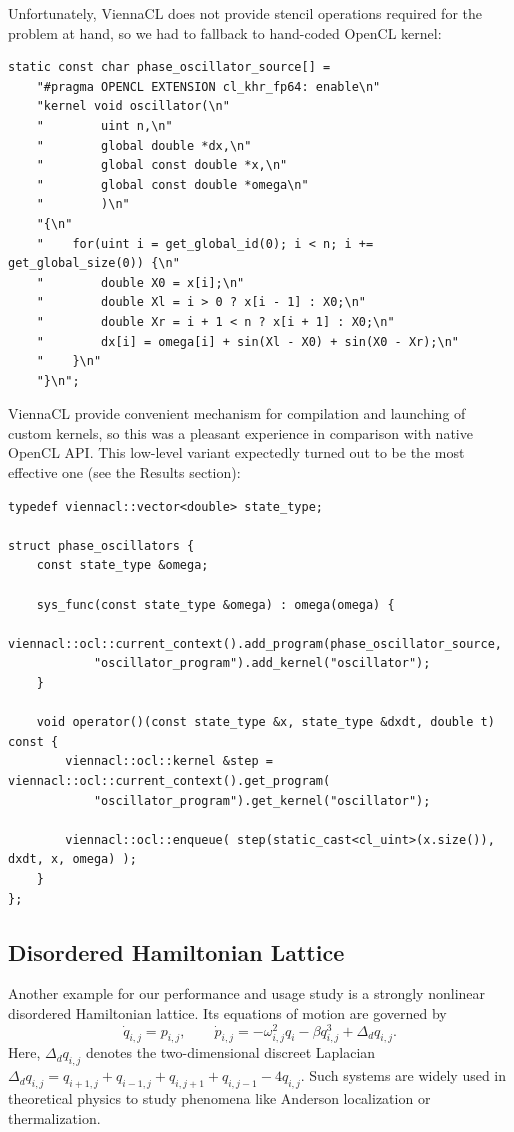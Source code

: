 \documentclass[1p]{elsarticle}
\begin{document}
Unfortunately, ViennaCL does not provide stencil operations required for
the problem at hand, so we had to fallback to hand-coded OpenCL kernel:
\begin{lstlisting}
static const char phase_oscillator_source[] =
    "#pragma OPENCL EXTENSION cl_khr_fp64: enable\n"
    "kernel void oscillator(\n"
    "        uint n,\n"
    "        global double *dx,\n"
    "        global const double *x,\n"
    "        global const double *omega\n"
    "        )\n"
    "{\n"
    "    for(uint i = get_global_id(0); i < n; i += get_global_size(0)) {\n"
    "        double X0 = x[i];\n"
    "        double Xl = i > 0 ? x[i - 1] : X0;\n"
    "        double Xr = i + 1 < n ? x[i + 1] : X0;\n"
    "        dx[i] = omega[i] + sin(Xl - X0) + sin(X0 - Xr);\n"
    "    }\n"
    "}\n";
\end{lstlisting}
ViennaCL provide convenient mechanism for compilation and launching of custom
kernels, so this was a pleasant experience in comparison with native OpenCL
API. This low-level variant expectedly turned out to be the most effective one
(see the Results section):
\begin{lstlisting}[firstnumber=last]
typedef viennacl::vector<double> state_type;

struct phase_oscillators {
    const state_type &omega;

    sys_func(const state_type &omega) : omega(omega) {
        viennacl::ocl::current_context().add_program(phase_oscillator_source,
            "oscillator_program").add_kernel("oscillator");
    }

    void operator()(const state_type &x, state_type &dxdt, double t) const {
        viennacl::ocl::kernel &step = viennacl::ocl::current_context().get_program(
            "oscillator_program").get_kernel("oscillator");

        viennacl::ocl::enqueue( step(static_cast<cl_uint>(x.size()), dxdt, x, omega) );
    }
};
\end{lstlisting}








%
%
\subsection{Disordered Hamiltonian Lattice}


Another example for our performance and usage study is a strongly
nonlinear disordered Hamiltonian lattice. Its equations of motion are
governed by
\begin{equation}
\dot{q}_{i,j} = p_{i,j}, \quad \quad 
\dot{p}_{i,j} = - \omega_{i,j}^2 q_i - \beta q_{i,j}^3 + \Delta_d q_{i,j}.
\label{eq:disordered_ham}
\end{equation}
Here, $\Delta_d q_{i,j}$ denotes the two-dimensional discreet Laplacian
$\Delta_d
q_{i,j}=q_{i+1,j}+q_{i-1,j}+q_{i,j+1}+q_{i,j-1}-4q_{i,j}$. Such
systems are widely used in theoretical physics to study phenomena
like Anderson localization or thermalization.
\end{document}
